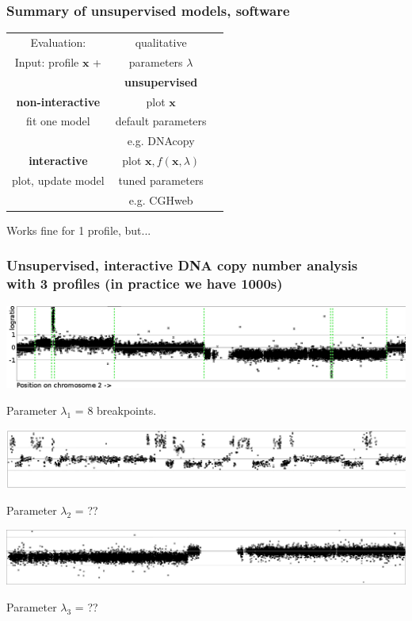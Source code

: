 \documentclass{beamer}
\begin{document}
\begin{frame}
  \frametitle{Summary of unsupervised models, software}

  \begin{center}
  \begin{tabular}{c|c|c}
    Evaluation: & qualitative &  \\
    Input: profile $\mathbf x$ + & parameters $\lambda$ &  \\
        & \textbf{unsupervised} & \\
    \hline
    \textbf{non-interactive}
    & plot $\mathbf x$\\
    fit one model 
    & default parameters &  \\
    & e.g. DNAcopy \\
    \hline
    \textbf{interactive}
    & plot $\mathbf x, f(\mathbf x, \lambda)$\\
    plot, update model 
    & tuned parameters & \\
    & e.g. CGHweb  
  \end{tabular}
  \end{center}

  Works fine for 1 profile, but...

\end{frame}

\begin{frame}
  \frametitle{Unsupervised, interactive DNA copy number analysis\\
  with 3 profiles (in practice we have 1000s)}
  \includegraphics[width=\textwidth]{unlabeled-breakpoints-8}

  Parameter $\lambda_1$ = 8 breakpoints.

  \vskip 0.1in

  \includegraphics[width=\textwidth]{lots-of-breaks}

  Parameter $\lambda_2$ = ??

  \vskip 0.1in

  \includegraphics[width=\textwidth]{only-one-break}

  Parameter $\lambda_3$ = ??

\end{frame}
\end{document}
